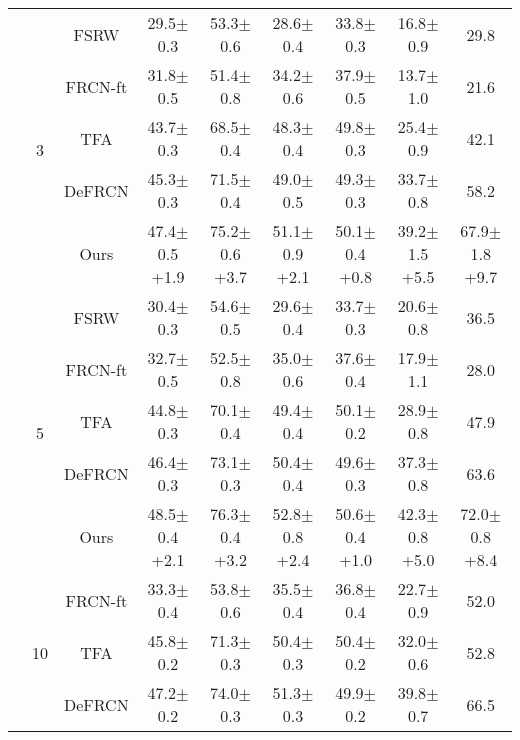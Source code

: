 \documentclass{article}
\begin{document}
\begin{table}[hbt!]
\begin{adjustbox}{width=0.79\textwidth}
{\begin{tabular}{c|c|c|ccc|c|cc}
         \cmidrule{2-9}
         &\multirow{5}{*}{3}&FSRW \cite{metayolo} & 29.5$\pm$0.3&53.3$\pm$0.6&28.6$\pm$0.4&33.8$\pm$0.3&16.8$\pm$0.9&29.8 \\
         &&FRCN-ft \cite{metarcnn}&31.8$\pm$0.5&51.4$\pm$0.8&34.2$\pm$0.6&37.9$\pm$0.5&13.7$\pm$1.0&21.6\\
         &&TFA \cite{tfa}&43.7$\pm$0.3&68.5$\pm$0.4&48.3$\pm$0.4&49.8$\pm$0.3&25.4$\pm$0.9&42.1\\
         &&DeFRCN \cite{defrcn}&45.3$\pm$0.3&71.5$\pm$0.4&49.0$\pm$0.5&49.3$\pm$0.3&33.7$\pm$0.8&58.2\\
         && \cellcolor{gray!30}Ours&\cellcolor{gray!30}47.4$\pm$0.5 {\scriptsize \color{red}+1.9}&\cellcolor{gray!30}75.2$\pm$0.6 {\scriptsize \color{red}+3.7}&\cellcolor{gray!30}51.1$\pm$0.9 {\scriptsize \color{red}+2.1}&\cellcolor{gray!30}50.1$\pm$0.4 {\scriptsize \color{red}+0.8}&\cellcolor{gray!30}39.2$\pm$1.5 {\scriptsize \color{red}+5.5}&\cellcolor{gray!30}67.9$\pm$1.8 {\scriptsize \color{red}+9.7}\\
         \cmidrule{2-9}
         &\multirow{5}{*}{5}&FSRW \cite{metayolo} & 30.4$\pm$0.3&54.6$\pm$0.5&29.6$\pm$0.4&33.7$\pm$0.3&20.6$\pm$0.8&36.5 \\
         &&FRCN-ft \cite{metarcnn}&32.7$\pm$0.5&52.5$\pm$0.8&35.0$\pm$0.6&37.6$\pm$0.4&17.9$\pm$1.1&28.0\\
         &&TFA \cite{tfa}&44.8$\pm$0.3&70.1$\pm$0.4&49.4$\pm$0.4&50.1$\pm$0.2&28.9$\pm$0.8&47.9\\
         &&DeFRCN \cite{defrcn}&46.4$\pm$0.3&73.1$\pm$0.3&50.4$\pm$0.4&49.6$\pm$0.3&37.3$\pm$0.8&63.6\\
         && \cellcolor{gray!30}Ours&\cellcolor{gray!30}48.5$\pm$0.4 {\scriptsize \color{red}+2.1}&\cellcolor{gray!30}76.3$\pm$0.4 {\scriptsize \color{red}+3.2}&\cellcolor{gray!30}52.8$\pm$0.8 {\scriptsize \color{red}+2.4}&\cellcolor{gray!30}50.6$\pm$0.4 {\scriptsize \color{red}+1.0}&\cellcolor{gray!30}42.3$\pm$0.8 {\scriptsize \color{red}+5.0}&\cellcolor{gray!30}72.0$\pm$0.8 {\scriptsize \color{red}+8.4}\\
         \cmidrule{2-9}
         &\multirow{5}{*}{10}& FRCN-ft \cite{metarcnn}&33.3$\pm$0.4&53.8$\pm$0.6&35.5$\pm$0.4&36.8$\pm$0.4&22.7$\pm$0.9&52.0 \\
         &&TFA \cite{tfa}&45.8$\pm$0.2&71.3$\pm$0.3&50.4$\pm$0.3&50.4$\pm$0.2&32.0$\pm$0.6&52.8\\
         &&DeFRCN \cite{defrcn}&47.2$\pm$0.2&74.0$\pm$0.3&51.3$\pm$0.3&49.9$\pm$0.2&39.8$\pm$0.7&66.5\\

\end{tabular}}
\end{adjustbox}
\end{table}
\end{document}
